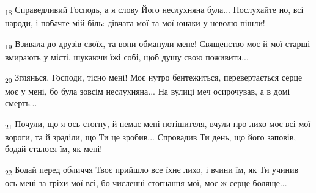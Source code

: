 \begin{tcolorbox}
\textsubscript{18} Справедливий Господь, а я слову Його неслухняна була... Послухайте но, всі народи, і побачте мій біль: дівчата мої та мої юнаки у неволю пішли!
\end{tcolorbox}
\begin{tcolorbox}
\textsubscript{19} Взивала до друзів своїх, та вони обманули мене! Священство моє й мої старші вмирають у місті, шукаючи їжі собі, щоб душу свою поживити...
\end{tcolorbox}
\begin{tcolorbox}
\textsubscript{20} Зглянься, Господи, тісно мені! Моє нутро бентежиться, перевертається серце моє у мені, бо була зовсім неслухняна... На вулиці меч осирочував, а в домі смерть...
\end{tcolorbox}
\begin{tcolorbox}
\textsubscript{21} Почули, що я ось стогну, й немає мені потішителя, вчули про лихо моє всі мої вороги, та й зраділи, що Ти це зробив... Спровадив Ти день, що його заповів, бодай сталося їм, як мені!
\end{tcolorbox}
\begin{tcolorbox}
\textsubscript{22} Бодай перед обличчя Твоє прийшло все їхнє лихо, і вчини їм, як Ти учинив ось мені за гріхи мої всі, бо численні стогнання мої, моє ж серце боляще...
\end{tcolorbox}
